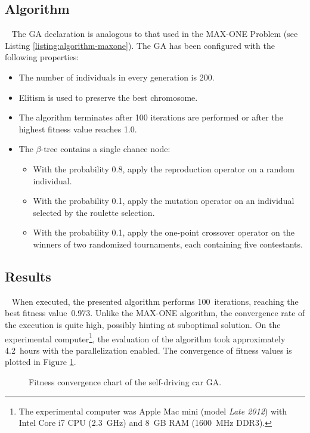 \subsection{Algorithm}~\label{section:car-algorithm}
The GA declaration is analogous to that used in the MAX-ONE Problem (see Listing \ref{listing:algorithm-maxone}). The GA has been configured with the following properties:
~
\begin{itemize}
	\item The number of individuals in every generation is 200.
	\item Elitism is used to preserve the best chromosome.
	\item The algorithm terminates after 100 iterations are performed or after the highest fitness value reaches 1.0.
	\item The $\beta$-tree contains a single chance node:
	~
	\begin{itemize}
		\item With the probability 0.8, apply the reproduction operator on a random individual.
		\item With the probability 0.1, apply the mutation operator on an individual selected by the roulette selection.
		\item With the probability 0.1, apply the one-point crossover operator on the winners of two randomized tournaments, each containing five contestants.
	\end{itemize}
\end{itemize}

\subsection{Results}~\label{section:car-results}
When executed, the presented algorithm performs 100~iterations, reaching the best fitness value~0.973. Unlike the MAX-ONE algorithm, the convergence rate of the execution is quite high, possibly hinting at suboptimal solution. On the experimental computer\footnote{The experimental computer was Apple Mac mini (model \textit{Late 2012}) with Intel Core i7 CPU (2.3~GHz) and 8~GB RAM (1600~MHz DDR3).}, the evaluation of the algorithm took approximately 4.2~hours with the parallelization enabled. The convergence of fitness values is plotted in Figure \ref{fig:car-fitness}.

\begin{figure}[ht]
	\centering
	\caption{Fitness convergence chart of the self-driving car GA.}
	\label{fig:car-fitness}
\end{figure}

